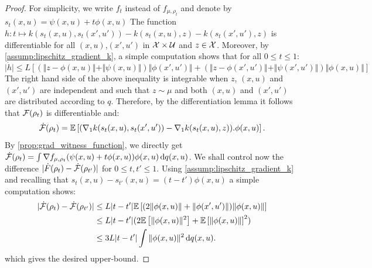 \begin{proof}
For simplicity, we write $f_t$ instead of $f_{\mu,\rho_t}$ and denote by $s_t(x,u)= \psi(x,u)+t\phi(x,u)$
The function $h: t\mapsto k(s_t(x,u),s_t(x',u')) - k(s_t(x,u),z) - k(s_t(x',u'),z)$ is differentiable for all $(x,u)$,$(x',u')$ in ${{\mathcal X}}\times \mathcal{U}$ and $z\in {{\mathcal X}}$. 
Moreover, by \cref{assump:lipschitz_gradient_k}, a simple computation shows that for all $0\leq t\leq 1$:%
\[
\vert \dot{h} \vert \leq L\left[ (\Vert z - \phi(x,u)\Vert + \Vert \psi(x,u)\Vert) \Vert \phi(x',u')\Vert +  
(\Vert z - \phi(x',u')\Vert + \Vert \psi(x',u')\Vert )\Vert \phi(x,u)\Vert \right]
\]
The right hand side of the above inequality is integrable when $z$,  $(x,u)$ and  $(x',u')$ are independent and such that $z\sim \mu$ and both $(x,u)$ and $(x',u')$ are distributed according to $q$. Therefore, by the differentiation lemma \cite[Theorem 6.28]{Klenke:2008} it follows that ${{\mathcal F}}(\rho_t)$ is differentiable and:
\begin{align}\label{eq:time_derivative_mmd}
\dot{{{\mathcal F}}}(\rho_t) = \mathbb{E}\left[(\nabla_1 k(s_t(x,u),s_t(x',u'))-\nabla_1 k(s_t(x,u),z)).\phi(x,u)\right].
\end{align}
By \cref{prop:grad_witness_function}, we directly get $\dot{{{\mathcal F}}}(\rho_t) = \int \nabla f_{\mu,\rho_t}(\psi(x,u)+t\phi(x,u)) \phi(x,u)\mathop{}\!\mathrm{d} q(x,u)$.
 We shall control now the difference $\vert \dot{F}(\rho_t)-\dot{{{\mathcal F}}}(\rho_{t'})\vert$ for $0\leq t,t'\leq 1$. Using \cref{assump:lipschitz_gradient_k} and recalling that $s_t(x,u)-s_{t'}(x,u)= (t-t')\phi(x,u)$ a simple computation shows:
\begin{align*}
	\vert\dot{{{\mathcal F}}}(\rho_t)-\dot{{{\mathcal F}}}(\rho_{t'}) \vert 
	&\leq L\vert t-t' \vert \mathbb{E}\left[(2\Vert \phi(x,u) \Vert + \Vert \phi(x',u')\Vert )\Vert \phi(x,u)\Vert  \right]\\
	  &\leq L\vert t-t'\vert(2\mathbb{E}\left[\Vert \phi(x,u)\Vert^2 \right]  + \mathbb{E}\left[\Vert \phi(x,u)\Vert \right]^2)\\
	 &\leq 3L\vert t-t'\vert\int\Vert \phi(x,u)\Vert^2 \mathop{}\!\mathrm{d} q(x,u).
\end{align*}
which gives the desired upper-bound.
\end{proof}



